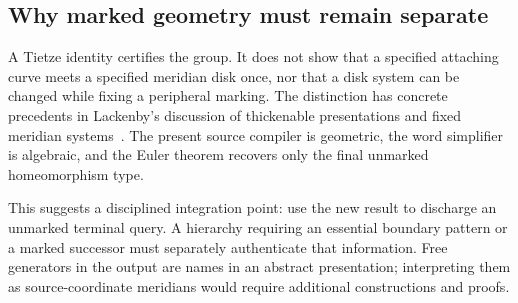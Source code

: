 \subsection{Why marked geometry must remain separate}

A Tietze identity certifies the group. It does not show that a specified
attaching curve meets a specified meridian disk once, nor that a disk system
can be changed while fixing a peripheral marking. The distinction has concrete
precedents in Lackenby's discussion of thickenable presentations and fixed
meridian systems~\cite[Section 6.1]{LackenbyStable2026}. The present source
compiler is geometric, the word simplifier is algebraic, and the Euler theorem
recovers only the final unmarked homeomorphism type.

This suggests a disciplined integration point: use the new result to discharge
an unmarked terminal query. A hierarchy requiring an essential boundary pattern
or a marked successor must separately authenticate that information. Free
generators in the output are names in an abstract presentation; interpreting
them as source-coordinate meridians would require additional constructions and
proofs.

